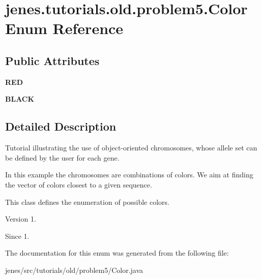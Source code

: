 \hypertarget{enumjenes_1_1tutorials_1_1old_1_1problem5_1_1_color}{\section{jenes.\-tutorials.\-old.\-problem5.\-Color Enum Reference}
\label{enumjenes_1_1tutorials_1_1old_1_1problem5_1_1_color}
}
\subsection*{Public Attributes}
\begin{DoxyCompactItemize}
\item 
\hypertarget{enumjenes_1_1tutorials_1_1old_1_1problem5_1_1_color_ad51840590e9a87bd4367c25e5022866b}{{\bfseries R\-E\-D}}\label{enumjenes_1_1tutorials_1_1old_1_1problem5_1_1_color_ad51840590e9a87bd4367c25e5022866b}

\item 
\hypertarget{enumjenes_1_1tutorials_1_1old_1_1problem5_1_1_color_a8c48229adc1957d055626d3ce74bc22f}{{\bfseries B\-L\-A\-C\-K}}\label{enumjenes_1_1tutorials_1_1old_1_1problem5_1_1_color_a8c48229adc1957d055626d3ce74bc22f}

\end{DoxyCompactItemize}


\subsection{Detailed Description}
Tutorial illustrating the use of object-\/oriented chromosomes, whose allele set can be defined by the user for each gene.

In this example the chromosomes are combinations of colors. We aim at finding the vector of colors closest to a given sequence.

This class defines the enumeration of possible colors.

\begin{DoxyVersion}{Version}
1. 
\end{DoxyVersion}
\begin{DoxySince}{Since}
1. 
\end{DoxySince}


The documentation for this enum was generated from the following file\-:\begin{DoxyCompactItemize}
\item 
jenes/src/tutorials/old/problem5/Color.\-java\end{DoxyCompactItemize}
